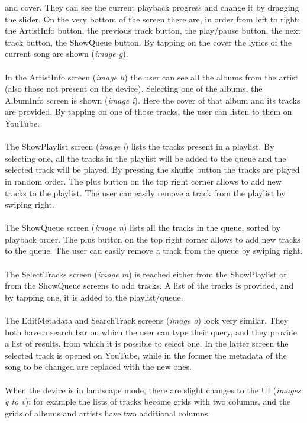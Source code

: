 \documentclass{article}
\begin{document}
and cover. They can see the current playback progress and change it by
dragging the slider. On the very bottom of the screen there are, in order from
left to right: the ArtistInfo button, the previous track button, the play/pause
button, the next track button, the ShowQueue button.
By tapping on the cover the lyrics of the current song are shown (\textit{image g}).
\\\\
In the ArtistInfo screen (\textit{image h}) the user can see all the albums from the
artist (also those not present on the device). Selecting one of the albums, the
AlbumInfo screen is shown (\textit{image i}). Here the cover of that album and its tracks
are provided. By tapping on one of those tracks, the user can listen to them on
YouTube.
\\\\
The ShowPlaylist screen (\textit{image l}) lists the tracks present in a playlist. By
selecting one, all the tracks in the playlist will be added to the queue and the
selected track will be played. By pressing the shuffle button the tracks are
played in random order. The plus button on the top right corner allows to add
new tracks to the playlist. The user can easily remove a track from the playlist
by swiping right.
\\\\
The ShowQueue screen (\textit{image n}) lists all the tracks in the queue, sorted by
playback order. The plus button on the top right corner allows to add new tracks
to the queue. The user can easily remove a track from the queue by swiping
right. 
\\\\
The SelectTracks screen (\textit{image m}) is reached either from the ShowPlaylist or
from the ShowQueue screens to add tracks. A list of the tracks is provided, and
by tapping one, it is added to the playlist/queue.
\\\\
The EditMetadata and SearchTrack screens (\textit{image o}) look very similar. They
both have a search bar on which the user can type their query, and they provide
a list of results, from which it is possible to select one. In the latter screen
the selected track is opened on YouTube, while in the former the metadata of the
song to be changed are replaced with the new ones.
\\\\
When the device is in landscape mode, there are slight changes to the UI (\textit{images
q to v}): for example the lists of tracks become grids with two columns, and
the grids of albums and artists have two additional columns.
\end{document}
